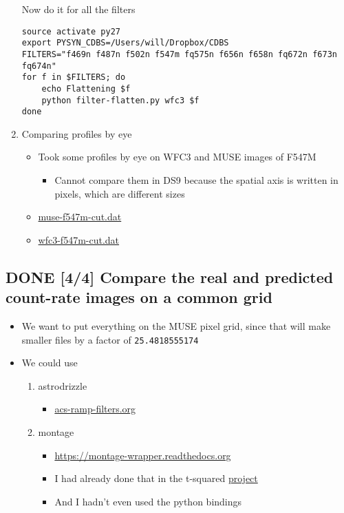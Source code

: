 \documentclass[11pt]{article}
\begin{document}
\begin{enumerate}
Now do it for all the filters
\begin{verbatim}
source activate py27
export PYSYN_CDBS=/Users/will/Dropbox/CDBS
FILTERS="f469n f487n f502n f547m fq575n f656n f658n fq672n f673n fq674n"
for f in $FILTERS; do
    echo Flattening $f
    python filter-flatten.py wfc3 $f
done
\end{verbatim}
\item Comparing profiles by eye
\label{sec:orgheadline31}
\begin{itemize}
\item Took some profiles by eye on WFC3 and MUSE images of F547M
\begin{itemize}
\item Cannot compare them in DS9 because the spatial axis is written in pixels, which are different sizes
\end{itemize}
\item \url{muse-f547m-cut.dat}
\item \url{wfc3-f547m-cut.dat}
\end{itemize}
\end{enumerate}
\subsection{{\bfseries\sffamily DONE} [4/4] Compare the real and predicted count-rate images on a common grid}
\label{sec:orgheadline38}
\begin{itemize}
\item We want to put everything on the MUSE pixel grid, since that will make smaller files by a factor of \texttt{25.4818555174}
\item We could use
\begin{enumerate}
\item astrodrizzle
\begin{itemize}
\item \href{file:///Users/will/Dropbox/OrionHST-2012/HST-ACS/acs-ramp-filters.org}{acs-ramp-filters.org}
\end{itemize}
\item montage
\begin{itemize}
\item \url{https://montage-wrapper.readthedocs.org}
\item I had already done that in the t-squared \href{../../Work/RubinWFC3/Tsquared/orion-t2.org}{project}
\item And I hadn't even used the python bindings
\end{itemize}
\end{enumerate}
\end{itemize}
\end{document}
